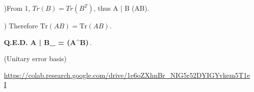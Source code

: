 \documentclass[12pt]{article}
\renewcommand{\>}{\rangle}
\newcommand{\<}{\langle}
\begin{document}
)From 1, \)\(Tr(B)  = Tr(B^T)\), thus \< A | B\>  \Rightarrow {}(AB).\newline


\newline{}) Therefore \(\mathrm{Tr}(AB) = \mathrm{Tr}(AB)\).\newline

\textbf{Q.E.D. \< A | B\>_{} = (A^\dagger B)\,}.
 
 
 
 
 
 
 
 
 


\newpage


 (Unitary error basis)

\noindent
\newline\url{https://colab.research.google.com/drive/1e6oZXhnBr\_NIG5r52DYIGYvkem5T1eI}
\end{document}

